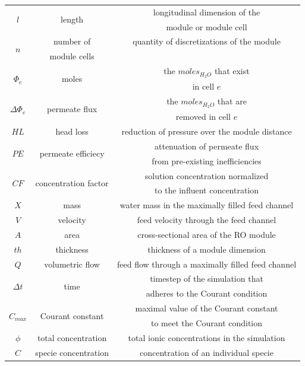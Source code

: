 \begin{supplementary}
\begin{longtable}{c|c|c}
    \multirow{2}{1.5em}{$l$} & \multirow{2}{3em}{length} & longitudinal dimension of the\\& & module or module cell \\ \midrule
    \multirow{2}{1.5em}{$n$} & number of & quantity of discretizations of the module \\ & module cells & \\ \midrule
    \multirow{2}{1.5em}{$\Phi_e$} & \multirow{2}{3em}{moles} & the $moles_{H_2O}$ that exist \\& & in cell $e$ \\ \midrule  
    \multirow{2}{1.5em}{$\Delta \Phi_e$} & \multirow{2}{3em}{permeate flux} & the $moles_{H_2O}$ that are \\& & removed in cell $e$ \\ \midrule  
    $HL$ & head loss & reduction of pressure over the module distance \\ \midrule
    \multirow{2}{2em}{$PE$} & \multirow{2}{3em}{permeate efficiecy} & attenuation of permeate flux \\& & from pre-existing inefficiencies \\ \midrule  
    \multirow{2}{2em}{$CF$} & \multirow{2}{3em}{concentration factor} & solution concentration normalized \\& & to the influent concentration \\ \midrule
    $X$ & mass & water mass in the maximally filled feed channel \\ \midrule
    $V$ & velocity & feed velocity through the feed channel \\ \midrule
    $A$ & area & cross-sectional area of the RO module \\ \midrule
    $th$ & thickness & thickness of a module dimension \\ \midrule
    $Q$ & volumetric flow & feed flow through a maximally filled feed channel \\ \midrule
    \multirow{2}{1.5em}{$\Delta t$} & \multirow{2}{3em}{time} & timestep of the simulation that \\& & adheres to the Courant condition \\ \midrule
    \multirow{2}{2em}{$C_{max}$} & \multirow{2}{3em}{Courant constant} & maximal value of the Courant constant \\& & to meet the Courant condition \\ \midrule
    $\phi$ & total concentration & total ionic concentrations in the simulation \\ \midrule
    $C$ & specie concentration & concentration of an individual specie \\ \midrule

\end{longtable}
\end{supplementary}
